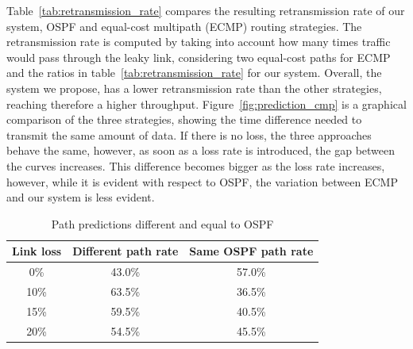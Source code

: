 Table~\ref{tab:retransmission_rate} compares the resulting retransmission rate of our system, OSPF and equal-cost multipath (ECMP) routing strategies. The retransmission rate is computed by taking into account how many times traffic would pass through the leaky link, considering two equal-cost paths for ECMP and the ratios in table~\ref{tab:retransmission_rate} for our system. Overall, the system we propose, has a lower retransmission rate than the other strategies, reaching therefore a higher throughput. Figure~\ref{fig:prediction_cmp} is a graphical comparison of the three strategies, showing the time difference needed to transmit the same amount of data. If there is no loss, the three approaches behave the same, however, as soon as a loss rate is introduced, the gap between the curves increases. This difference becomes bigger as the loss rate increases, however, while it is evident with respect to OSPF, the variation between ECMP and our system is less evident.
\begin{table}[h]
\centering
{%
\begin{tabular}{|c|c|c|}
\hline
\multicolumn{1}{|l|}{\textbf{Link loss}} & \multicolumn{1}{l|}{\textbf{Different path rate}} & \multicolumn{1}{l|}{\textbf{Same OSPF path rate}} \\ \hline
0\% & 43.0\% & 57.0\% \\ \hline
10\% & 63.5\% & 36.5\% \\ \hline
15\% & 59.5\% & 40.5\% \\ \hline
20\% & 54.5\% & 45.5\% \\ \hline
\end{tabular}%
}
\caption{Path predictions different and equal to OSPF}
\label{tab:same_path_rate}
\end{table}



\begin{table}[]
\centering
{}
\caption{Routing strategies retransmission rate}
\label{tab:retransmission_rate}
\end{table}

